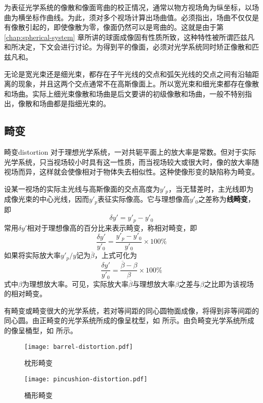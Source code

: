 \documentclass[cn,10pt,chinesefont=founder,math=mtpro2,cite=super,toc=onecol,twoside,openany]{elegantbook}
\begin{document}
为表征光学系统的像散和像面弯曲的校正情况，通常以物方视场角为纵坐标，以场曲为横坐标作曲线。为此，须对多个视场计算出场曲值。必须指出，场曲不仅仅是有像散引起的，即使像散为零，像面仍然可以是弯曲的。这就是由于第 \ref{chap:spherical-system} 章所讲的球面成像固有性质所致，这种特性被所谓匹兹凡和所决定，下文会进行讨论。为得到平的像面，必须对光学系统同时矫正像散和匹兹凡和。

无论是宽光束还是细光束，都存在子午光线的交点和弧矢光线的交点之间有沿轴距离的现象，并且这两个交点通常不在高斯像面上。所以宽光束和细光束都存在像散和场曲。实际上细光束像散和场曲是后文要讲的初级像散和场曲，一般不特别指出，像散和场曲都是指细光束的。

\subsection{畸变}
\label{subsect:distortion}
\begin{definition}{畸变}{distortion}
	对于理想光学系统，一对共轭平面上的放大率是常数。但对于实际光学系统，只当视场较小时具有这一性质，而当视场较大或很大时，像的放大率随视场而异，这样就会使像相对于物体失去相似性。这种使像形变的缺陷称为畸变。
\end{definition}

设某一视场的实际主光线与高斯像面的交点高度为$y'_p$，当无彗差时，主光线即为成像光束的中心光线，因而$y'_p$表征实际像高。它与理想像高$y'_0$之差称为\textbf{线畸变}，即
\begin{equation}
\delta y'=y'_p-y'_0
\end{equation}
常用$\delta y'$相对于理想像高的百分比来表示畸变，称相对畸变，即
\begin{equation}
\frac{\delta y'}{y'_0}=\frac{y'_p-y'_0}{y'_0}\times100\%
\end{equation}
如果将实际放大率$y'_p/y$记为$\overline{\beta}$，上式可化为
\begin{equation}
\frac{\delta y'}{y'_0}=\frac{\overline{\beta}-\beta}{\beta}\times100\%
\end{equation}
式中$\beta$为理想放大率。可见，实际放大率$\overline{\beta}$与理想放大率$\beta$之差与$\beta$之比即为该视场的相对畸变。

有畸变或畸变很大的光学系统，若对等间距的同心圆物面成像，将得到非等间距的同心圆。由正畸变的光学系统所成的像呈枕型，如  所示。由负畸变光学系统所成的像呈桶型，如  所示。

\begin{figure}[htbp]
	\centering
	\begin{minipage}[t]{0.45\textwidth}
		\centering
		\texttt{[image: barrel-distortion.pdf]}
		\caption{枕形畸变}
		\label{fig:barrel-distortion}
	\end{minipage}
	\quad
	\begin{minipage}[t]{0.45\textwidth}
		\centering
		\texttt{[image: pincushion-distortion.pdf]}
		\caption{桶形畸变}
		\label{fig:pincushion-distortion}
	\end{minipage}
\end{figure}
\end{document}
